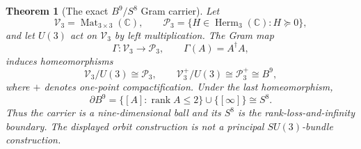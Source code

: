 \documentclass[11pt,letterpaper]{article}
\numberwithin{equation}{section}
\newtheorem{theorem}{Theorem}[section]
\theoremstyle{definition}
\theoremstyle{remark}
\newcommand{\C}{\mathbb C}
\newcommand{\rank}{\operatorname{rank}}
\begin{document}
\begin{theorem}[The exact \(B^9/S^8\) Gram carrier]
\label{thm:B9-S8-Gram-carrier}
Let
\[
 \mathcal V_3=\operatorname{Mat}_{3\times3}(\C),
 \qquad
 \mathcal P_3=\{H\in\operatorname{Herm}_3(\C):H\succeq0\},
\]
and let \(U(3)\) act on \(\mathcal V_3\) by left multiplication.  The Gram
map
\[
 \Gamma:\mathcal V_3\longrightarrow\mathcal P_3,
 \qquad \Gamma(A)=A^\dagger A,
\]
induces homeomorphisms
\begin{equation}
 \mathcal V_3/U(3)\cong\mathcal P_3,
 \qquad
 \mathcal V_3^+/U(3)\cong\mathcal P_3^+\cong B^9,
 \label{eq:Gram-B9-quotient}
\end{equation}
where \(+\) denotes one-point compactification.  Under the last
homeomorphism,
\begin{equation}
 \partial B^9
 =\{[A]:\rank A\leq2\}\cup\{[\infty]\}
 \cong S^8.
 \label{eq:Gram-rank-loss-S8}
\end{equation}
Thus the carrier is a nine-dimensional ball and its \(S^8\) is the
rank-loss-and-infinity boundary.  The displayed orbit construction is not
a principal \(SU(3)\)-bundle construction.
\end{theorem}
\end{document}
